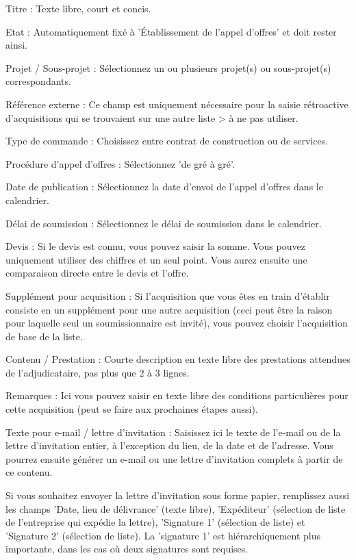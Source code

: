 \begin{compactitem}
\item
Titre : Texte libre, court et concis.
\item
Etat : Automatiquement fixé à 'Établissement de l'appel d'offres' et doit rester ainsi.
\item
Projet / Sous-projet : Sélectionnez un ou plusieurs projet(s) ou sous-projet(s) correspondants.
\item
Référence externe : Ce champ est uniquement nécessaire pour la saisie rétroactive d'acquisitions qui se trouvaient sur une autre liste > à ne pas utiliser.
\item
Type de commande : Choisissez entre contrat de construction ou de services.
\item
Procédure d'appel d'offres : Sélectionnez 'de gré à gré'.
\item
Date de publication : Sélectionnez la date d'envoi de l'appel d'offres dans le calendrier.
\item
Délai de soumission : Sélectionnez le délai de soumission dans le calendrier.
\item
Devis : Si le devis est connu, vous pouvez saisir la somme. Vous pouvez uniquement utiliser des chiffres et un seul point. Vous aurez ensuite une comparaison directe entre le devis et l'offre.
\item
Supplément pour acquisition : Si l'acquisition que vous êtes en train d'établir consiste en un supplément pour une autre acquisition (ceci peut être la raison pour laquelle seul un soumissionnaire est invité), vous pouvez choisir l'acquisition de base de la liste.
\item
Contenu / Prestation : Courte description en texte libre des prestations attendues de l'adjudicataire, pas plus que 2 à 3 lignes.
\item
Remarques : Ici vous pouvez saisir en texte libre des conditions particulières pour cette acquisition (peut se faire aux prochaines étapes aussi).
\item
Texte pour e-mail / lettre d'invitation : Saisissez ici le texte de l'e-mail ou de la lettre d'invitation entier, à l'exception du lieu, de la date et de l'adresse. Vous pourrez ensuite générer un e-mail ou une lettre d'invitation complets à partir de ce contenu.
\item
Si vous souhaitez envoyer la lettre d'invitation sous forme papier, remplissez aussi les champs 'Date, lieu de délivrance' (texte libre), 'Expéditeur' (sélection de liste de l'entreprise qui expédie la lettre), 'Signature 1' (sélection de liste) et 'Signature 2' (sélection de liste). La 'signature 1' est hiérarchiquement plus importante, dans les cas où deux signatures sont requises.
\end{compactitem}

